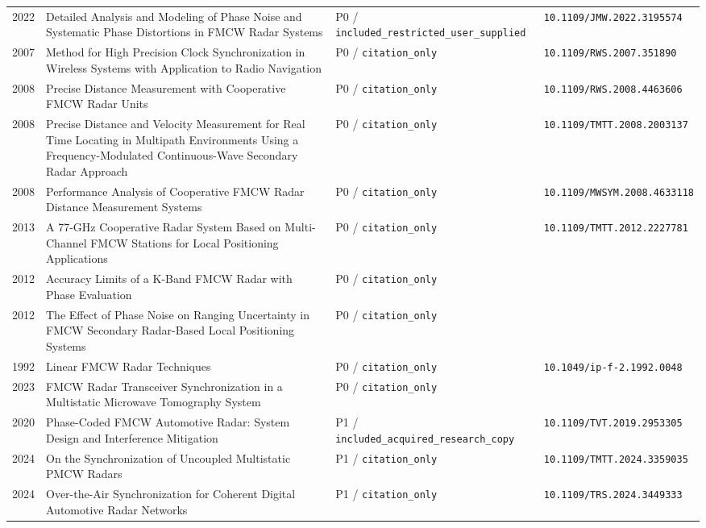 \documentclass[11pt]{article}
\begin{document}
\begin{longtable}{@{}p{}p{}p{}p{}@{}}
2022 & Detailed Analysis and Modeling of Phase Noise and Systematic Phase Distortions in FMCW Radar Systems & P0 / \nolinkurl{included_restricted_user_supplied} & \nolinkurl{10.1109/JMW.2022.3195574} \\
2007 & Method for High Precision Clock Synchronization in Wireless Systems with Application to Radio Navigation & P0 / \nolinkurl{citation_only} & \nolinkurl{10.1109/RWS.2007.351890} \\
2008 & Precise Distance Measurement with Cooperative FMCW Radar Units & P0 / \nolinkurl{citation_only} & \nolinkurl{10.1109/RWS.2008.4463606} \\
2008 & Precise Distance and Velocity Measurement for Real Time Locating in Multipath Environments Using a Frequency-Modulated Continuous-Wave Secondary Radar Approach & P0 / \nolinkurl{citation_only} & \nolinkurl{10.1109/TMTT.2008.2003137} \\
2008 & Performance Analysis of Cooperative FMCW Radar Distance Measurement Systems & P0 / \nolinkurl{citation_only} & \nolinkurl{10.1109/MWSYM.2008.4633118} \\
2013 & A 77-GHz Cooperative Radar System Based on Multi-Channel FMCW Stations for Local Positioning Applications & P0 / \nolinkurl{citation_only} & \nolinkurl{10.1109/TMTT.2012.2227781} \\
2012 & Accuracy Limits of a K-Band FMCW Radar with Phase Evaluation & P0 / \nolinkurl{citation_only} &  \\
2012 & The Effect of Phase Noise on Ranging Uncertainty in FMCW Secondary Radar-Based Local Positioning Systems & P0 / \nolinkurl{citation_only} &  \\
1992 & Linear FMCW Radar Techniques & P0 / \nolinkurl{citation_only} & \nolinkurl{10.1049/ip-f-2.1992.0048} \\
2023 & FMCW Radar Transceiver Synchronization in a Multistatic Microwave Tomography System & P0 / \nolinkurl{citation_only} &  \\
2020 & Phase-Coded FMCW Automotive Radar: System Design and Interference Mitigation & P1 / \nolinkurl{included_acquired_research_copy} & \nolinkurl{10.1109/TVT.2019.2953305} \\
2024 & On the Synchronization of Uncoupled Multistatic PMCW Radars & P1 / \nolinkurl{citation_only} & \nolinkurl{10.1109/TMTT.2024.3359035} \\
2024 & Over-the-Air Synchronization for Coherent Digital Automotive Radar Networks & P1 / \nolinkurl{citation_only} & \nolinkurl{10.1109/TRS.2024.3449333} \\

\end{longtable}
\end{document}
